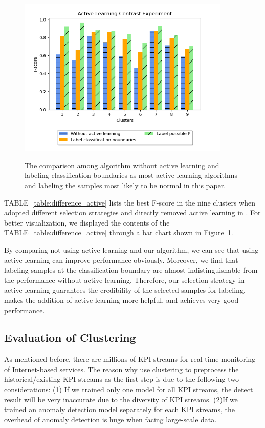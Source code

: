 \begin{figure}
  \setlength{\belowcaptionskip}{-0.2cm}
  \begin{minipage}[H]{1.0\linewidth}
  \centering
  \includegraphics[width=0.9\textwidth]{ADS_Journal/PU figures/active_update.png}\\
  \end{minipage}
  \caption{The comparison among algorithm without active learning and labeling classification boundaries as most active learning algorithms and labeling the samples most likely to be normal in this paper.}
  \label{fig:whether_active_or_not}
\end{figure}


TABLE~\ref{table:difference_active} lists the best F-score in the nine clusters when adopted different selection strategies and directly removed active learning in \name{}. For better visualization, we displayed the contents of the TABLE~\ref{table:difference_active} through a bar chart shown in Figure~\ref{fig:whether_active_or_not}.

By comparing not using active learning and our algorithm, we can see that using active learning can improve performance obviously. Moreover, we find that labeling samples at the classification boundary are almost indistinguishable from the performance without active learning. Therefore, 
our selection strategy in active learning guarantees the credibility of the selected samples for labeling, makes the addition of active learning more helpful, and achieves very good performance.

\subsection{Evaluation of Clustering}
\label{subsec:whether-clustering}
As mentioned before, there are millions of KPI streams for real-time monitoring of Internet-based services. The reason why \name{} use clustering to preprocess the historical/existing KPI streams as the first step is due to the following two considerations:
(1) If we trained only one model for all KPI streams, the detect result will be very inaccurate due to the diversity of KPI streams.
(2)If we trained an anomaly detection model separately for each KPI streams, the overhead of anomaly detection is huge when facing large-scale data.

